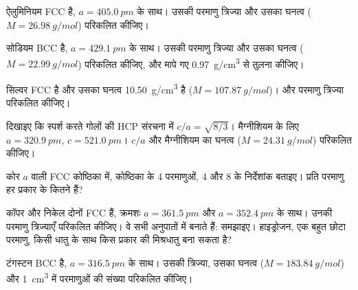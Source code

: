 \begin{exercise}[$\star$]\label{exo:b1:crystals-metals:3}
ऐलुमिनियम FCC है, $a = \qty{405.0}{pm}$ के साथ। उसकी परमाणु त्रिज्या और
उसका घनत्व ($M = \qty{26.98}{g/mol}$) परिकलित कीजिए।
\end{exercise}

\begin{exercise}[$\star$]\label{exo:b1:crystals-metals:4}
सोडियम BCC है, $a = \qty{429.1}{pm}$ के साथ। उसकी परमाणु त्रिज्या और
उसका घनत्व ($M = \qty{22.99}{g/mol}$) परिकलित कीजिए, और मापे गए
\qty{0.97}{g/cm^3} से तुलना कीजिए।
\end{exercise}

\begin{exercise}[$\star\star$]\label{exo:b1:crystals-metals:5}
सिल्वर FCC है और उसका घनत्व \qty{10.50}{g/cm^3} है
($M = \qty{107.87}{g/mol}$)।  और परमाणु
त्रिज्या परिकलित कीजिए।
\end{exercise}

\begin{exercise}[$\star\star$]\label{exo:b1:crystals-metals:6}
दिखाइए कि स्पर्श करते गोलों की HCP संरचना में $c/a = \sqrt{8/3}$।
मैग्नीशियम के लिए $a = \qty{320.9}{pm}$, $c = \qty{521.0}{pm}$। $c/a$
और मैग्नीशियम का घनत्व ($M = \qty{24.31}{g/mol}$) परिकलित कीजिए।
\end{exercise}

\begin{exercise}[$\star\star$]\label{exo:b1:crystals-metals:7}
कोर $a$ वाली FCC कोष्ठिका में, कोष्ठिका के 4 परमाणुओं, 4  और
8  के निर्देशांक बताइए। प्रति परमाणु हर प्रकार के कितने हैं?
\end{exercise}

\begin{exercise}[$\star\star$]\label{exo:b1:crystals-metals:8}
कॉपर और निकेल दोनों FCC हैं, क्रमशः $a = \qty{361.5}{pm}$ और
$a = \qty{352.4}{pm}$ के साथ। उनकी परमाणु त्रिज्याएँ परिकलित कीजिए। वे सभी अनुपातों में
 बनाते हैं: समझाइए। हाइड्रोजन, एक बहुत छोटा परमाणु, किसी धातु के
साथ किस प्रकार की मिश्रधातु बना सकता है?
\end{exercise}

\begin{exercise}[$\star\star$]\label{exo:b1:crystals-metals:9}
टंगस्टन BCC है, $a = \qty{316.5}{pm}$ के साथ। उसकी त्रिज्या, उसका
घनत्व ($M = \qty{183.84}{g/mol}$) और \qty{1}{cm^3} में परमाणुओं की
संख्या परिकलित कीजिए।
\end{exercise}

